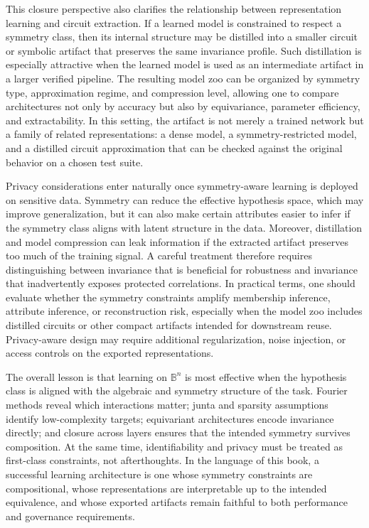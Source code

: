 \documentclass[11pt]{article}
\begin{document}
This closure perspective also clarifies the relationship between representation learning and circuit extraction. If a learned model is constrained to respect a symmetry class, then its internal structure may be distilled into a smaller circuit or symbolic artifact that preserves the same invariance profile. Such distillation is especially attractive when the learned model is used as an intermediate artifact in a larger verified pipeline. The resulting model zoo can be organized by symmetry type, approximation regime, and compression level, allowing one to compare architectures not only by accuracy but also by equivariance, parameter efficiency, and extractability. In this setting, the artifact is not merely a trained network but a family of related representations: a dense model, a symmetry-restricted model, and a distilled circuit approximation that can be checked against the original behavior on a chosen test suite.

Privacy considerations enter naturally once symmetry-aware learning is deployed on sensitive data. Symmetry can reduce the effective hypothesis space, which may improve generalization, but it can also make certain attributes easier to infer if the symmetry class aligns with latent structure in the data. Moreover, distillation and model compression can leak information if the extracted artifact preserves too much of the training signal. A careful treatment therefore requires distinguishing between invariance that is beneficial for robustness and invariance that inadvertently exposes protected correlations. In practical terms, one should evaluate whether the symmetry constraints amplify membership inference, attribute inference, or reconstruction risk, especially when the model zoo includes distilled circuits or other compact artifacts intended for downstream reuse. Privacy-aware design may require additional regularization, noise injection, or access controls on the exported representations.

The overall lesson is that learning on \(\mathbb{B}^n\) is most effective when the hypothesis class is aligned with the algebraic and symmetry structure of the task. Fourier methods reveal which interactions matter; junta and sparsity assumptions identify low-complexity targets; equivariant architectures encode invariance directly; and closure across layers ensures that the intended symmetry survives composition. At the same time, identifiability and privacy must be treated as first-class constraints, not afterthoughts. In the language of this book, a successful learning architecture is one whose symmetry constraints are compositional, whose representations are interpretable up to the intended equivalence, and whose exported artifacts remain faithful to both performance and governance requirements.
\end{document}
